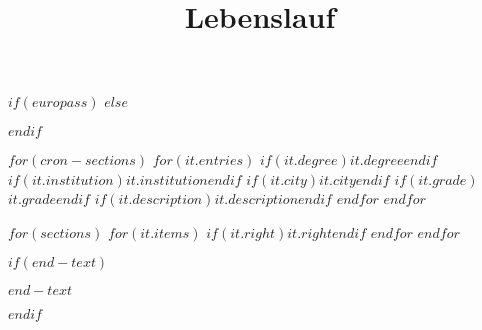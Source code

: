 \documentclass[
$if(europass.nologo)$
  nologo,
$endif$
$if(europass.notitle)$
  notitle,
$endif$
$if(europass.nototpages)$
  nototpages,
$endif$
]{europasscv}
\title{Lebenslauf}
\begin{document}
$if(europass)$
\ecvpersonalinfo
$else$
\maketitle
$endif$

$for(cron-sections)$
  $for(it.entries)$
    {$if(it.degree)$$it.degree$$endif$}
    {$if(it.institution)$$it.institution$$endif$}
    {$if(it.city)$$it.city$$endif$}
    {$if(it.grade)$$it.grade$$endif$}
    {$if(it.description)$$it.description$$endif$}
  $endfor$
$endfor$

$for(sections)$
  $for(it.items)$
    {$if(it.right)$$it.right$$endif$}
  $endfor$
$endfor$

$if(end-text)$
\vfill
\begin{center}
\textit{\small $end-text$}
\end{center}
$endif$
\end{document}
